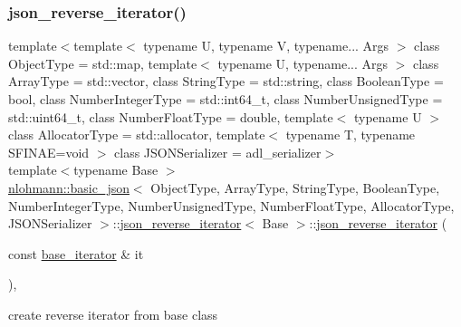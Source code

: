 \subsubsection{\texorpdfstring{json\_reverse\_iterator()}{json\_reverse\_iterator()}\hspace{0.1cm}{\footnotesize\ttfamily [2/2]}}
{\footnotesize\ttfamily template$<$template$<$ typename U, typename V, typename... Args $>$ class Object\+Type = std\+::map, template$<$ typename U, typename... Args $>$ class Array\+Type = std\+::vector, class String\+Type  = std\+::string, class Boolean\+Type  = bool, class Number\+Integer\+Type  = std\+::int64\+\_\+t, class Number\+Unsigned\+Type  = std\+::uint64\+\_\+t, class Number\+Float\+Type  = double, template$<$ typename U $>$ class Allocator\+Type = std\+::allocator, template$<$ typename T, typename S\+F\+I\+N\+A\+E=void $>$ class J\+S\+O\+N\+Serializer = adl\+\_\+serializer$>$ \\
template$<$typename Base $>$ \\
\mbox{\hyperlink{classnlohmann_1_1basic__json}{nlohmann\+::basic\+\_\+json}}$<$ Object\+Type, Array\+Type, String\+Type, Boolean\+Type, Number\+Integer\+Type, Number\+Unsigned\+Type, Number\+Float\+Type, Allocator\+Type, J\+S\+O\+N\+Serializer $>$\+::\mbox{\hyperlink{classnlohmann_1_1basic__json_1_1json__reverse__iterator}{json\+\_\+reverse\+\_\+iterator}}$<$ Base $>$\+::\mbox{\hyperlink{classnlohmann_1_1basic__json_1_1json__reverse__iterator}{json\+\_\+reverse\+\_\+iterator}} (\begin{DoxyParamCaption}\item[{const \mbox{\hyperlink{classnlohmann_1_1basic__json_1_1json__reverse__iterator_a5b7f3c5d86fe89a65d9552c1cac37261}{base\+\_\+iterator}} \&}]{it }\end{DoxyParamCaption})\hspace{0.3cm}{\ttfamily [inline]}, {\ttfamily [noexcept]}}



create reverse iterator from base class 



